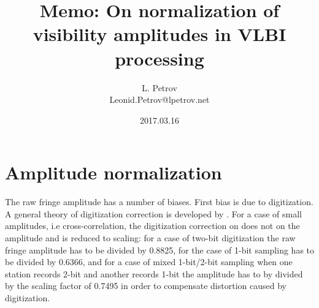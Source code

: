\documentclass[11pt]{article}
\title {  \LARGE\bf Memo: On normalization of visibility amplitudes in VLBI processing}
\author{ {\large\sc L. Petrov} \\
         {\small Leonid.Petrov@lpetrov.net }
       }
\date{2017.03.16}
\begin{document}
\maketitle

\section{Amplitude normalization}

  The raw fringe amplitude has a number of biases. First bias is due to 
digitization. A general theory of digitization correction is developed
by \citet{r:kog98}. For a case of small amplitudes, i.e cross-correlation,
the digitization correction on does not on the amplitude and is reduced to 
scaling: for a case of two-bit digitization the raw fringe amplitude
has to be divided by 0.8825, for the case of 1-bit sampling has to be 
divided by 0.6366, and for a case of mixed 1-bit/2-bit sampling when 
one station records 2-bit and another records 1-bit the amplitude has
to by divided by the scaling factor of 0.7495 in order to compensate 
distortion caused by digitization.
\end{document}
